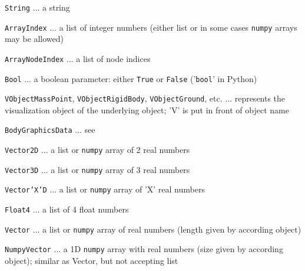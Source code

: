   \item \texttt{String} $\ldots$ a string
  \item \texttt{ArrayIndex} $\ldots$ a list of integer numbers (either list or in some cases \texttt{numpy} arrays may be allowed)
  \item \texttt{ArrayNodeIndex} $\ldots$ a list of node indices
  \item \texttt{Bool} $\ldots$ a boolean parameter: either \texttt{True} or \texttt{False} ('\texttt{bool}' in Python)
  \item \texttt{VObjectMassPoint}, \texttt{VObjectRigidBody}, \texttt{VObjectGround}, etc.  $\ldots$ represents the visualization object of the underlying object; 'V' is put in front of object name
  \item \texttt{BodyGraphicsData} $\ldots$ see 
%	
	\item \texttt{Vector2D} $\ldots$ a list or \texttt{numpy} array of 2 real numbers
	\item \texttt{Vector3D} $\ldots$ a list or \texttt{numpy} array of 3 real numbers
	\item \texttt{Vector'X'D} $\ldots$ a list or \texttt{numpy} array of 'X' real numbers
	\item \texttt{Float4} $\ldots$ a list of 4 float numbers
%
	\item \texttt{Vector} $\ldots$ a list or \texttt{numpy} array of real numbers (length given by according object)
	\item \texttt{NumpyVector} $\ldots$ a 1D \texttt{numpy} array with real numbers (size given by according object); similar as Vector, but not accepting list

